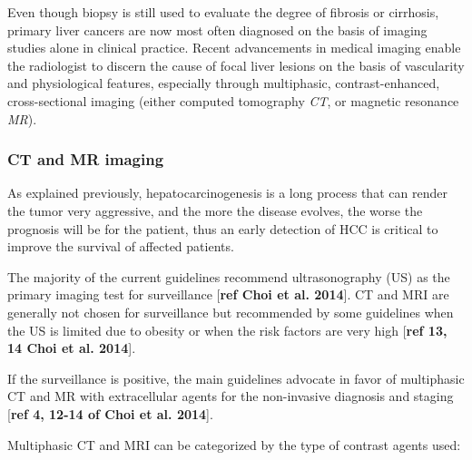 \documentclass[]{article}
\begin{document}
Even though biopsy is still used to evaluate the degree of fibrosis or
cirrhosis, primary liver cancers are now most often diagnosed on the
basis of imaging studies alone in clinical practice. Recent advancements
in medical imaging enable the radiologist to discern the cause of focal
liver lesions on the basis of vascularity and physiological features,
especially through multiphasic, contrast-enhanced, cross-sectional
imaging (either computed tomography \emph{CT}, or magnetic resonance
\emph{MR}).

\subsubsection{CT and MR imaging}\label{ct-and-mr-imaging}

As explained previously, hepatocarcinogenesis is a long process that can
render the tumor very aggressive, and the more the disease evolves, the
worse the prognosis will be for the patient, thus an early detection of
HCC is critical to improve the survival of affected patients.

The majority of the current guidelines recommend ultrasonography (US) as
the primary imaging test for surveillance {[}\textbf{ref Choi et al.
2014}{]}. CT and MRI are generally not chosen for surveillance but
recommended by some guidelines when the US is limited due to obesity or
when the risk factors are very high {[}\textbf{ref 13, 14 Choi et al.
2014}{]}.

If the surveillance is positive, the main guidelines advocate in favor
of multiphasic CT and MR with extracellular agents for the non-invasive
diagnosis and staging {[}\textbf{ref 4, 12-14 of Choi et al. 2014}{]}.

Multiphasic CT and MRI can be categorized by the type of contrast agents
used:
\end{document}

